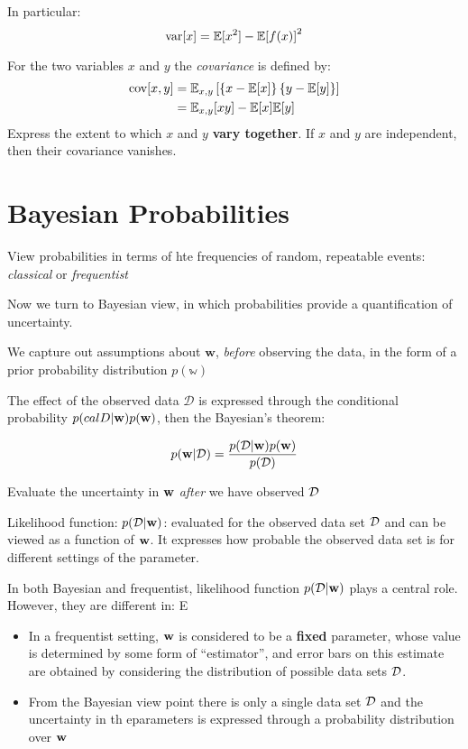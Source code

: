 In particular:
\begin{equation}
    \mbox{var}[x] = \mathbb{E}[x^2] - {\mathbb{E}[f(x)]}^2
    \label{var-x}
\end{equation}

For the two variables $x$ and $y$ the \emph{covariance} is defined by:
\begin{align}
    \mbox{cov}[x,y] &= \mathbb{E}_{x,y}\left[ \left\{ x - \mathbb{E}[x] \right\}\left\{
    y-\mathbb{E}[y] \right\}\right] \\
    &= \mathbb{E}_{x,y}[xy] - \mathbb{E}[x]\mathbb{E}[y]
\end{align}
Express the extent to which $x$ and $y$ \textbf{vary together}.
If $x$ and $y$ are independent, then their covariance vanishes.
\section{Bayesian Probabilities}
View probabilities in terms of hte frequencies of random, repeatable
events: \emph{classical} or \emph{frequentist}

Now we turn to Bayesian view, in which probabilities provide a
quantification of uncertainty.

We capture out assumptions about $\mathbf{w}$, \emph{before } observing
the data, in the form of a prior probability distribution $p(\mathbb{w})$

The effect of the observed data $\mathcal{D}$ is expressed through the
conditional probability $p(calD|\mathbf{w})p(\mathbf{w})$, then the Bayesian's theorem:

\begin{equation}
    p(\mathbf{w}|\mathcal{D}) = \frac{p(\mathcal{D}|\mathbf{w})p(\mathbf{w})}{p(\mathcal{D})}
    \label{bayes}
\end{equation}

Evaluate the uncertainty in $\mathbf{w}$ \emph{after} we have observed $\mathcal{D}$

Likelihood function: $p(\mathcal{D}|\mathbf{w})$: evaluated for the observed data set
$\mathcal{D}$ and can be viewed as a function of $\mathbf{w}$. It expresses how
probable the observed data set is for different settings of the parameter.

In both Bayesian and frequentist, likelihood function $p(\mathcal{D}|\mathbf{w})$ plays
a central role. However, they are different in:
E\begin{itemize}
    \item In a frequentist setting, $\mathbf{w}$ is considered to be a
        \textbf{fixed} parameter, whose value is determined by some form
        of ``estimator'', and error bars on this estimate are obtained by
        considering the distribution of possible data sets $\mathcal{D}$.
    \item From the Bayesian view point there is only a single data set
        $\mathcal{D}$ and the uncertainty in th eparameters is expressed through
        a probability distribution over $\mathbf{w}$
\end{itemize}

